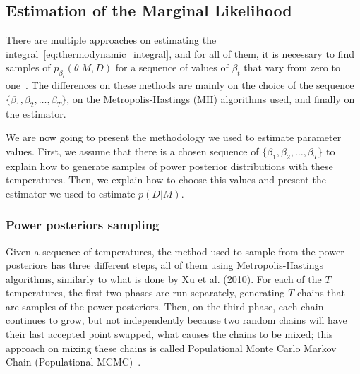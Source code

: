 \subsection{Estimation of the Marginal Likelihood}
There are multiple approaches on estimating the 
integral~\ref{eq:thermodynamic_integral}, and for all of them, it is 
necessary to find samples of $p_{\beta_t} (\theta | M, D)$ for a 
sequence of values of $\beta_t$ that vary from zero to one~\cite{Xura20, 
Vyshemirsky2007, Friel2008}. The differences on these methods are mainly 
on the choice of the sequence $\{\beta_1, \beta_2, \ldots, \beta_T\}$,
on the Metropolis-Hastings (MH) algorithms used, and finally on the 
estimator.

We are now going to present the methodology we used to estimate 
parameter values. First, we assume that there is a chosen sequence of
$\{\beta_1, \beta_2, \ldots, \beta_T\}$ to explain how to generate 
samples of power posterior distributions with these temperatures. Then,
we explain how to choose this values and present the estimator we used
to estimate $p (D | M)$.

\subsubsection{Power posteriors sampling}
\label{sec:power_posteriors_sampling}
Given a sequence of temperatures, the method used to sample from the
power posteriors has three different steps, all of them using 
Metropolis-Hastings algorithms, similarly to what is done by Xu et al. 
(2010). For each of the $T$ temperatures, the first two phases are
run separately, generating $T$ chains that are samples of the power 
posteriors. Then, on the third phase, each chain continues to grow, but
not independently because two random chains will have their last accepted 
point swapped, what causes the chains to be mixed; this approach on 
mixing these chains is called Populational Monte Carlo Markov 
Chain (Populational MCMC)~\cite{Friel2008}.

